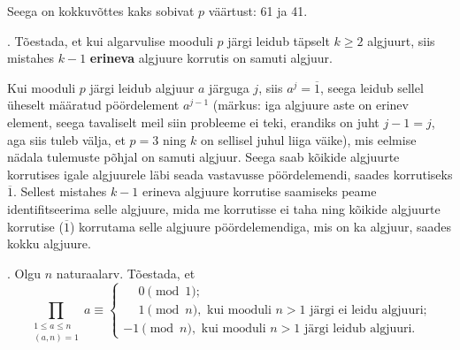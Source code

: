 \documentclass[a4paper, 10pt]{article}
\newcommand{\Z}{\mathbb{Z}}
\newcommand{\w}{\overline}
\begin{document}
Seega on kokkuvõttes kaks sobivat $p$ väärtust: 61 ja 41. 
\bigskip

. Tõestada, et kui algarvulise mooduli $p$ järgi leidub täpselt $k\geq 2$ algjuurt, siis mistahes $k-1$ {\bf erineva} algjuure korrutis on samuti algjuur. 

\bigskip
Kui mooduli $p$ järgi leidub algjuur $a$ järguga $j$, siis $a^j=\w{1}$, seega leidub sellel üheselt määratud pöördelement $a^{j-1}$ (märkus: iga algjuure aste on erinev element, seega tavaliselt meil siin probleeme ei teki, erandiks on juht $j-1=j$, aga siis tuleb välja, et $p=3$ ning $k$ on sellisel juhul liiga väike), mis eelmise nädala tulemuste põhjal on samuti algjuur. Seega saab kõikide algjuurte korrutises igale algjuurele läbi seada vastavusse pöördelemendi, saades korrutiseks $\w{1}$. Sellest mistahes $k-1$ erineva algjuure korrutise saamiseks peame identifitseerima selle algjuure, mida me korrutisse ei taha ning kõikide algjuurte korrutise ($\w{1}$) korrutama selle algjuure pöördelemendiga, mis on ka algjuur, saades kokku algjuure.
\bigskip
\pagebreak

. Olgu $n$ naturaalarv. Tõestada, et $$\prod\limits_{\substack{1\leq a \leq n\\(a,n)=1}}a\equiv\begin{cases}
\phantom{-}0\pmod{1};\\
\phantom{-}1\pmod{n},\text{ kui mooduli }n>1 \text{ järgi ei leidu algjuuri;}\\
-1\pmod{n},\text{ kui mooduli }n>1 \text{ järgi leidub algjuuri.}
\end{cases}$$

\bigskip
\end{document}
